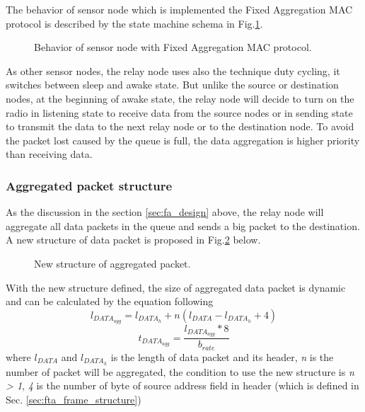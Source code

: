 The behavior of sensor node which is implemented the Fixed Aggregation MAC protocol is described by the state machine schema in Fig.\ref{fig:fixed_aggregation}.
\begin{figure}[t]
\begin{center}
\caption{Behavior of sensor node with Fixed Aggregation MAC protocol.}
\label{fig:fixed_aggregation}
\end{center}
\end{figure}
As other sensor nodes, the relay node uses also the technique duty cycling, it switches between sleep and awake state. But unlike the source or destination nodes, at the beginning of awake state, the relay node will decide to turn on the radio in listening state to receive data from the source nodes or in sending state to transmit the data to the next relay node or to the destination node. To avoid the packet lost caused by the queue is full, the data aggregation is higher priority than receiving data.
\subsubsection{Aggregated packet structure}
As the discussion in the section \ref{sec:fa_design} above, the relay node will aggregate all data packets in the queue and sends a big packet to the destination. A new structure of data packet is proposed in Fig.\ref{fig:aggregated_packet} below.
\begin{figure}[!b]
\begin{center}
\caption{New structure of aggregated packet.}
\label{fig:aggregated_packet}
\end{center}
\end{figure}
With the new structure defined, the size of aggregated data packet is dynamic and can be calculated by the equation following
\begin{equation}
l_{DATA_{agg}} = l_{DATA_{h}} + n(l_{DATA} - l_{DATA_h} + 4)
\label{eq:aggregated_data_length}
\end{equation}
\begin{equation}
t_{DATA_{agg}} = \frac{l_{DATA_{agg}} * 8}{b_{rate}}
\label{eq:aggregated_data_sent_time}
\end{equation}
where $l_{DATA}$ and $l_{DATA_h}$ is the length of data packet and its header, \textit{n} is the number of packet will be aggregated, the condition to use the new structure is \textit{n > 1}, \textit{4} is the number of byte of source address field in header (which is defined in Sec. \ref{sec:fta_frame_structure})

